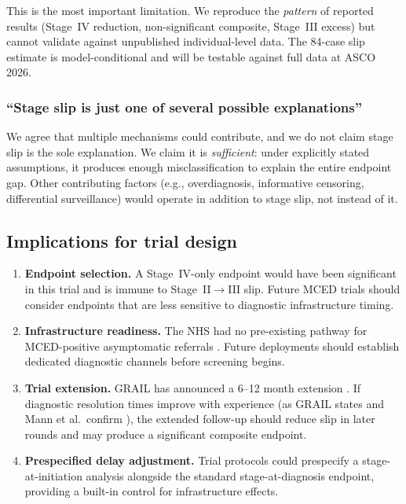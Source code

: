 \documentclass[11pt,letter]{article}
\begin{document}
This is the most important limitation. We reproduce the \emph{pattern}
of reported results (Stage~IV reduction, non-significant composite,
Stage~III excess) but cannot validate against unpublished individual-level
data. The 84-case slip estimate is model-conditional and will be testable against full data at ASCO 2026.

\subsubsection{``Stage slip is just one of several possible explanations''}

We agree that multiple mechanisms could contribute, and we do not claim
stage slip is the sole explanation. We claim it is \emph{sufficient}:
under explicitly stated assumptions, it produces enough misclassification
to explain the entire endpoint gap. Other contributing factors (e.g.,
overdiagnosis, informative censoring, differential surveillance) would
operate in addition to stage slip, not instead of it.


\subsection{Implications for trial design}

\begin{enumerate}[nosep]
\item \textbf{Endpoint selection.} A Stage~IV-only endpoint would have
  been significant in this trial and is immune to Stage~II$\to$III slip.
  Future MCED trials should consider endpoints that are less sensitive to
  diagnostic infrastructure timing.

\item \textbf{Infrastructure readiness.} The NHS had no pre-existing
  pathway for MCED-positive asymptomatic referrals \cite{Lowenhoff2025}.
  Future deployments should establish dedicated diagnostic channels before
  screening begins.

\item \textbf{Trial extension.} GRAIL has announced a 6--12 month
  extension \cite{GRAIL2026}. If diagnostic resolution times improve with
  experience (as GRAIL states and Mann et al.\ confirm \cite{Mann2025}),
  the extended follow-up should reduce slip in later rounds and may
  produce a significant composite endpoint.

\item \textbf{Prespecified delay adjustment.} Trial protocols could
  prespecify a stage-at-initiation analysis alongside the standard
  stage-at-diagnosis endpoint, providing a built-in control for
  infrastructure effects.
\end{enumerate}
\end{document}

